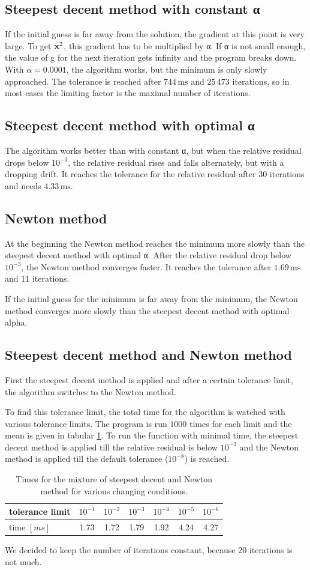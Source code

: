 \documentclass[a4paper,12pt]{article}
\newcommand{\unit}[1]{\ensuremath{\, \mathrm{#1}}}
\begin{document}
\subsection{Steepest decent method with constant α}
If the initial guess is far away from the solution, the gradient at this point is very large.
To get ${\bf x}^{2}$, this gradient has to be multiplied by α.
If α is not small enough, the value of g for the next iteration gets infinity and the program breaks down.
With $α= 0.0001$, the algorithm works, but the minimum is only slowly approached.
The tolerance is reached after $744\unit{ms}$ and $25\,473$ iterations, so in most cases the limiting factor is the maximal number of iterations.

\subsection{Steepest decent method with optimal α}
The algorithm works better than with constant α, but when the relative residual drops below $10^{-3}$, the relative residual rises and falls alternately, but with a dropping drift.
It reaches the tolerance for the relative residual after 30 iterations and needs $4.33\unit{ms}$.

\subsection{Newton method}
At the beginning the Newton method reaches the minimum more slowly than the steepest  decent method with optimal α. 
After the relative residual drop below $10^{-3}$, the Newton method converges faster.
It reaches the tolerance after $1.69\unit{ms}$ and $11$ iterations.

If the initial guess for the minimum is far away from the minimum, the Newton method converges more slowly than the steepest decent method with optimal alpha.


\subsection{Steepest decent method and Newton method}
First the steepest decent method is applied and after a certain tolerance limit, the algorithm switches to the Newton method.

To find this tolerance limit, the total time for the algorithm is watched with various tolerance limits.
The program is run $1000$ times for each limit and the mean is given in tabular \ref{tab:steepestnewton}.
To run the function with minimal time, the steepest decent method is applied till the relative residual is below $10^{-2}$ and the Newton method is applied till the default tolerance ($10^{-8}$) is reached.
\begin{table}[h]
	\centering
	\label{tab:steepestnewton}
	\begin{tabular}{l||c|c|c|c|c|c}
		tolerance limit & $10^{-1}$& $10^{-2}$&  $10^{-3}$& $10^{-4}$& $10^{-5}$& $10^{-6}$\\\hline
		time $[ms]$		& 1.73&1.72&1.79&1.92&4.24&4.27
	\end{tabular}
	\caption{Times for the mixture of steepest decent and Newton method for various changing conditions.} 
\end{table}


We decided to keep the number of iterations constant, because 20 iterations is not much. 
\end{document}
